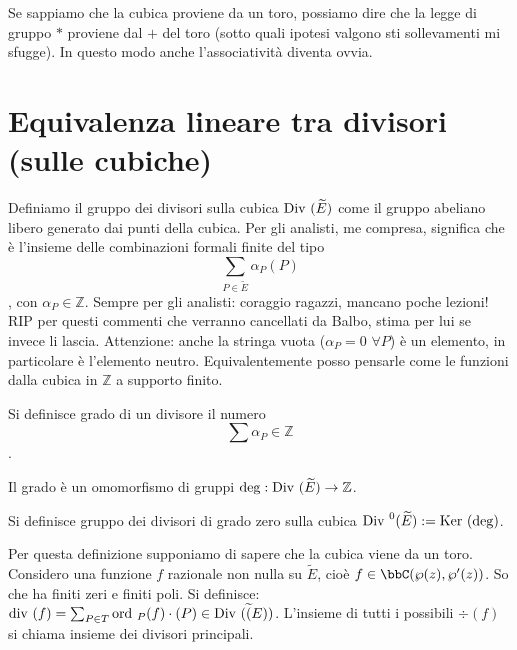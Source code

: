 \begin{osservazione}
Se sappiamo che la cubica proviene da un toro, possiamo dire che la legge di gruppo $*$ proviene dal $+$ del toro (sotto quali ipotesi valgono sti sollevamenti mi sfugge). In questo modo anche l'associatività diventa ovvia.
\end{osservazione}

\section{Equivalenza lineare tra divisori (sulle cubiche)}

\begin{definizione}
Definiamo il gruppo dei divisori sulla cubica $\mbox{Div }(\widetilde{E})$ come il gruppo abeliano libero generato dai punti della cubica. Per gli analisti, me compresa, significa che è l'insieme delle combinazioni formali finite del tipo $$\sum_{P \in \widetilde{E}} \alpha_P(P)$$,
con $\alpha_P \in \mathbb{Z}$.
Sempre per gli analisti: coraggio ragazzi, mancano poche lezioni!
RIP per questi commenti che verranno cancellati da Balbo, stima per lui se invece li lascia.
Attenzione: anche la stringa vuota ($\alpha_P=0$ $\forall P$) è un elemento, in particolare è l'elemento neutro.
Equivalentemente posso pensarle come le funzioni dalla cubica in $\mathbb{Z}$ a supporto finito.
\end{definizione}

\begin{definizione}
Si definisce grado di un divisore il numero $$\sum \alpha_P \in \mathbb{Z}$$.
\end{definizione} 

\begin{osservazione}Il grado è un omomorfismo di gruppi $\deg: \mbox{Div }(\widetilde{E}) \rightarrow \mathbb{Z}$.
\end{osservazione}


\begin{definizione}
Si definisce gruppo dei divisori di grado zero sulla cubica $\mbox{Div }^0(\widetilde{E}) := \mbox{Ker }(\deg)$.
\end{definizione}

\begin{definizione}
Per questa definizione supponiamo di sapere che la cubica viene da un toro.
Considero una funzione $f$ razionale non nulla su $\widetilde{E}$, cioè $f \in \bbC(\wp(z),\wp'(z))$. So che ha finiti zeri e finiti poli.
Si definisce: $\mbox{div }(f) = \sum_{P\in T} \mbox{ord }_P(f) \cdot (P) \in \mbox{Div }(\widetilde(E))$.
L'insieme di tutti i possibili $\div(f)$ si chiama insieme dei divisori principali.
\end{definizione}

